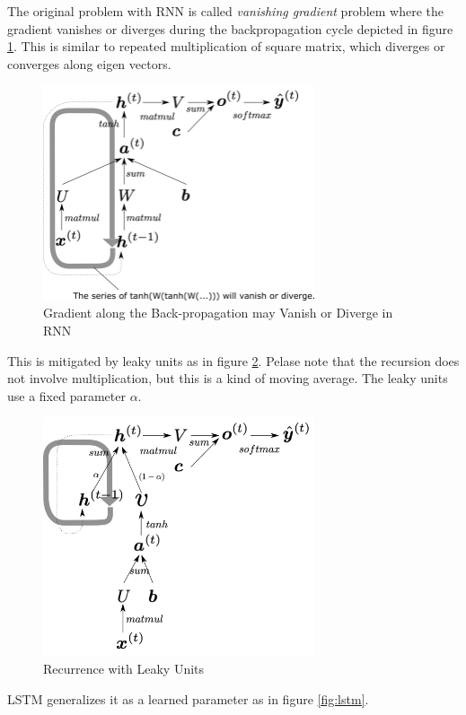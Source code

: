\documentclass[a4]{article}
\begin{document}
The original problem with RNN is called \emph{vanishing gradient} problem where the gradient vanishes or
diverges during the backpropagation cycle depicted in figure \ref{fig:rnn2}.
This is similar to repeated multiplication of square matrix, which diverges or converges along eigen vectors.


\begin{figure}[!htb]
\centering
\includegraphics[width=8cm]{rnn2.png}
\caption{Gradient along the Back-propagation may Vanish or Diverge in RNN}
\label{fig:rnn2}
\end{figure}


This is mitigated by leaky units as in figure \ref{fig:leaky_unit}. Pelase note that the recursion does not involve
multiplication, but this is a kind of moving average.
The leaky units use a fixed parameter $\alpha$. 

\begin{figure}[!htb]
\centering
\includegraphics[width=8cm]{leaky_unit.png}
\caption{Recurrence with Leaky Units}
\label{fig:leaky_unit}
\end{figure}

LSTM generalizes it as a learned parameter as in figure \ref{fig:lstm}.
\end{document}
